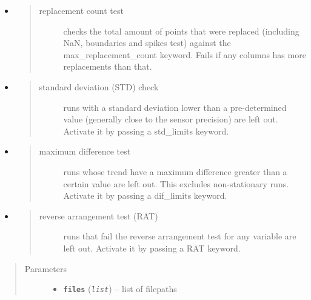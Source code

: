 \documentclass[a4paper,10pt,oneside]{sphinxmanual}
\begin{document}
\begin{fulllineitems}
\begin{itemize}
\item {} \begin{quote}\begin{description}
\item[{replacement count test}] \leavevmode
checks the total amount of points that were replaced (including NaN, boundaries and spikes test)
against the max\_replacement\_count keyword. Fails if any columns has more replacements than that.

\end{description}\end{quote}

\item {} \begin{quote}\begin{description}
\item[{standard deviation (STD) check}] \leavevmode
runs with a standard deviation lower than a pre-determined value (generally close to the
sensor precision) are left out.
Activate it by passing a std\_limits keyword.

\end{description}\end{quote}

\item {} \begin{quote}\begin{description}
\item[{maximum difference test}] \leavevmode
runs whose trend have a maximum difference greater than a certain value are left out.
This excludes non-stationary runs. Activate it by passing a dif\_limits keyword.

\end{description}\end{quote}

\item {} \begin{quote}\begin{description}
\item[{reverse arrangement test (RAT)}] \leavevmode
runs that fail the reverse arrangement test for any variable are left out.
Activate it by passing a RAT keyword.

\end{description}\end{quote}

\end{itemize}
\begin{quote}\begin{description}
\item[{Parameters}] \leavevmode\begin{itemize}
\item {} 
\textbf{\texttt{files}} (\emph{\texttt{list}}) -- list of filepaths


\end{itemize}
\end{description}
\end{quote}
\end{fulllineitems}
\end{document}
